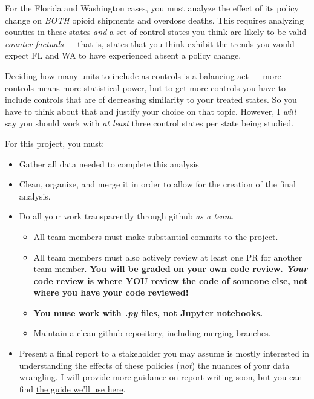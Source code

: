\documentclass[12pt]{article}
\begin{document}
For the Florida and Washington cases, you must analyze the effect of its policy change on \emph{BOTH} opioid shipments and overdose deaths. This requires analyzing counties in these states \emph{and} a set of control states you think are likely to be valid \emph{counter-factuals} — that is, states that you think exhibit the trends you would expect FL and WA to have experienced absent a policy change. 

Deciding how many units to include as controls is a balancing act — more controls means more statistical power, but to get more controls you have to include controls that are of decreasing similarity to your treated states. So you have to think about that and justify your choice on that topic. However, I \emph{will} say you should work with \emph{at least} three control states per state being studied. 

For this project, you must:

\begin{itemize}
  \item Gather all data needed to complete this analysis
  \item Clean, organize, and merge it in order to allow for the creation of the final analysis.
  \item Do all your work transparently through github \emph{as a team}.
  \begin{itemize}
    \item All team members must make substantial commits to the project.
    \item All team members must also actively review at least one PR for another team member. \textbf{You will be graded on your own code review. \emph{Your} code review is where YOU review the code of someone else, not where you have your code reviewed!}
    \item \textbf{You muse work with \emph{.py} files, not Jupyter notebooks.}
    \item Maintain a clean github repository, including merging branches.
  \end{itemize}
  \item Present a final report to a stakeholder you may assume is mostly interested in understanding the effects of these policies (\emph{not}) the nuances of your data wrangling. I will provide more guidance on report writing soon, but you can find \href{https://ds4humans.com/40_in_practice/27_data_science_memos.html}{the guide we'll use here}.
\end{itemize}
\end{document}

